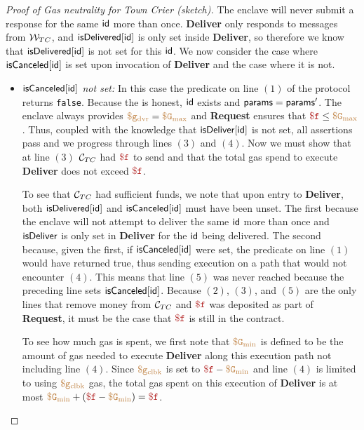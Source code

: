 \begin{proof}[Proof of Gas neutrality for Town Crier (sketch)]
The enclave will never submit a response for the same ${\sf id}$ more than once.
{\bf Deliver} only responds to messages from ${\cal W}_{TC}$, and ${\sf isDelivered}[{\sf id}]$ is only set inside {\bf Deliver},
so therefore we know that ${\sf isDelivered}[{\sf id}]$ is not set for this ${\sf id}$.
We now consider the case where ${\sf isCanceled}[{\sf id}]$ is set upon invocation of {\bf Deliver} and the case where it is not.
\begin{itemize}

\item {\it ${\sf isCanceled}[{\sf id}]$ not set:}
In this case the predicate on line $(1)$ of the protocol returns {\tt false}.
Because the \medname is honest, ${\sf id}$ exists and ${\sf params} = {\sf params}'$.
The enclave always provides $\tt {\color{brown} \$g_\text{dvr} } = \tt {\color{brown} \$G_\text{max} }$ and {\bf Request} ensures that $\fee \leq \constgasmax$.
Thus, coupled with the knowledge that ${\sf isDeliver}[{\sf id}]$ is not set, all assertions pass and we progress through lines $(3)$ and $(4)$.
Now we must show that at line $(3)$ ${\cal C}_{TC}$ had $\fee$ to send and that the total gas spend to execute {\bf Deliver} does not exceed $\fee$.

To see that ${\cal C}_{TC}$ had sufficient funds, we note that upon entry to {\bf Deliver}, both ${\sf isDelivered}[{\sf id}]$ and ${\sf isCanceled}[{\sf id}]$ must have been unset.
The first because the enclave will not attempt to deliver the same ${\sf id}$ more than once and ${\sf isDeliver}$ is only set in {\bf Deliver} for the ${\sf id}$ being delivered.
The second because, given the first, if ${\sf isCanceled}[{\sf id}]$ were set, the predicate on line $(1)$ would have returned true, thus sending execution on a path that would not encounter $(4)$.
This means that line $(5)$ was never reached because the preceding line sets ${\sf isCanceled}[{\sf id}]$.
Because $(2)$, $(3)$, and $(5)$ are the only lines that remove money from ${\cal C}_{TC}$ and $\fee$ was deposited as part of {\bf Request},
it must be the case that $\fee$ is still in the contract.

To see how much gas is spent, we first note that $\tt {\color{brown} \$G_\text{min} }$ is defined to be the amount of gas needed to execute {\bf Deliver} along this execution path not including line $(4)$.
Since $\tt {\color{brown} \$g_\text{clbk} }$ is set to $\fee - \constgasmin$ and line $(4)$ is limited to using $\tt {\color{brown} \$g_\text{clbk} }$ gas,
the total gas spent on this execution of {\bf Deliver} is at most $\constgasmin + (\fee - \constgasmin) = \fee$.



\end{itemize}
\end{proof}
